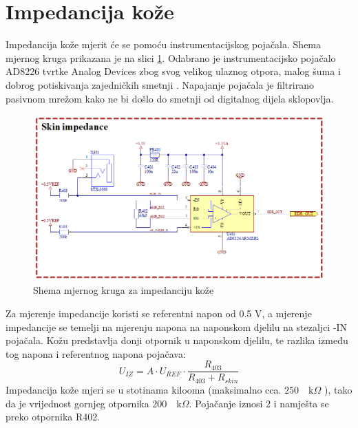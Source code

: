 \section{Impedancija kože}
Impedancija kože mjerit će se pomoću instrumentacijskog pojačala. Shema mjernog kruga prikazana je na slici \ref{slk:EDR}. Odabrano je instrumentacijsko pojačalo AD8226 tvrtke Analog Devices zbog svog velikog ulaznog otpora, malog šuma i dobrog potiskivanja zajedničkih smetnji \cite{ad:ad8226}. Napajanje pojačala je filtrirano pasivnom mrežom kako ne bi došlo do smetnji od digitalnog dijela sklopovlja.
\begin{figure}[htb]
    \centering
    \includegraphics[width=\textwidth]{Figures/EDR.png}
    \caption{Shema mjernog kruga za impedanciju kože}
    \label{slk:EDR}
\end{figure}
Za mjerenje impedancije koristi se referentni napon od 0.5 V, a mjerenje impedancije se temelji na mjerenju napona na naponskom djelilu na stezaljci -IN pojačala. Kožu predstavlja donji otpornik u naponskom djelilu, te razlika između tog napona i referentnog napona pojačava:
\begin{equation} \label{eq:EDR}
    U_{IZ}=A\cdot U_{REF}\cdot \frac{R_{403}}{R_{403}+R_{skin}}
\end{equation}
Impedancija kože mjeri se u stotinama kilooma (maksimalno cca. $250\quad \textrm{k}\Omega$ \cite{rskin}), tako da je vrijednost gornjeg otpornika $200\quad \textrm{k}\Omega$. Pojačanje iznosi 2 i namješta se preko otpornika R402.

